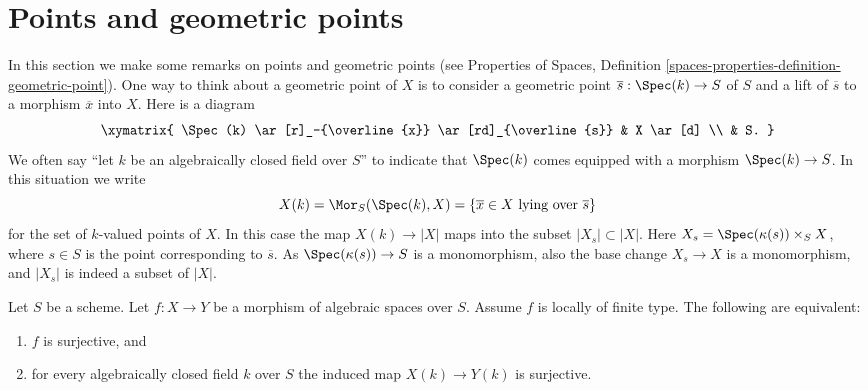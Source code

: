 \section{Points and geometric points}
\label{section-points-fields}

\noindent
In this section we make some remarks on points and geometric points (see
Properties of Spaces,
Definition \ref{spaces-properties-definition-geometric-point}).
One way to think about a geometric point of $X$ is to
consider a geometric point $\overline{s} : \Spec(k) \to S$ of $S$
and a lift of $\overline{s}$ to a morphism $\overline{x}$ into $X$.
Here is a diagram
$$
\xymatrix{
\Spec(k) \ar[r]_-{\overline{x}} \ar[rd]_{\overline{s}} & X \ar[d] \\
& S.
}
$$
We often say ``let $k$ be an algebraically closed field over $S$''
to indicate that $\Spec(k)$ comes equipped with a morphism
$\Spec(k) \to S$. In this situation we write
$$
X(k) = \Mor_S(\Spec(k), X) =
\{\overline{x} \in X\text{ lying over }\overline{s}\}
$$
for the set of $k$-valued points of $X$. In this case the map
$X(k) \to |X|$ maps into the subset $|X_s| \subset |X|$.
Here $X_s = \Spec(\kappa(s)) \times_S X$, where $s \in S$
is the point corresponding to $\overline{s}$. As
$\Spec(\kappa(s)) \to S$ is a monomorphism, also the base change
$X_s \to X$ is a monomorphism, and $|X_s|$ is indeed a subset of $|X|$.

\begin{lemma}
\label{lemma-locally-finite-type-surjective-geometric-points}
Let $S$ be a scheme. Let $f : X \to Y$ be a morphism of algebraic spaces
over $S$. Assume $f$ is locally of finite type. The following are equivalent:
\begin{enumerate}
\item $f$ is surjective, and
\item for every algebraically closed field $k$ over $S$ the induced
map $X(k) \to Y(k)$ is surjective.
\end{enumerate}
\end{lemma}

